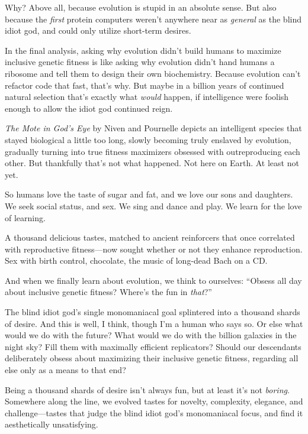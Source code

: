 {
 Why? Above all, because evolution is stupid in an absolute sense.
But also because the \textit{first} protein computers
weren't anywhere near as \textit{general} as the blind
idiot god, and could only utilize short-term desires.}

{
 In the final analysis, asking why evolution didn't
build humans to maximize inclusive genetic fitness is like asking why
evolution didn't hand humans a ribosome and tell them
to design their own biochemistry. Because evolution
can't refactor code that fast, that's
why. But maybe in a billion years of continued natural selection
that's exactly what \textit{would} happen, if
intelligence were foolish enough to allow the idiot god continued
reign.}

{
 \textit{The Mote in God's Eye} by Niven and
Pournelle depicts an intelligent species that stayed biological a
little too long, slowly becoming truly enslaved by evolution, gradually
turning into true fitness maximizers obsessed with outreproducing each
other. But thankfully that's not what happened. Not
here on Earth. At least not yet.}

{
 So humans love the taste of sugar and fat, and we love our sons
and daughters. We seek social status, and sex. We sing and dance and
play. We learn for the love of learning.}

{
 A thousand delicious tastes, matched to ancient reinforcers that
once correlated with reproductive fitness---now sought whether or not
they enhance reproduction. Sex with birth control, chocolate, the music
of long-dead Bach on a CD.}

{
 And when we finally learn about evolution, we think to ourselves:
``Obsess all day about inclusive genetic fitness?
Where's the fun in \textit{that}?''}

{
 The blind idiot god's single monomaniacal goal
splintered into a thousand shards of desire. And this is well, I think,
though I'm a human who says so. Or else what would we
do with the future? What would we do with the billion galaxies in the
night sky? Fill them with maximally efficient replicators? Should our
descendants deliberately obsess about maximizing their inclusive
genetic fitness, regarding all else only as a means to that end?}

{
 Being a thousand shards of desire isn't always
fun, but at least it's not \textit{boring}. Somewhere
along the line, we evolved tastes for novelty, complexity, elegance,
and challenge---tastes that judge the blind idiot god's
monomaniacal focus, and find it aesthetically unsatisfying.}

